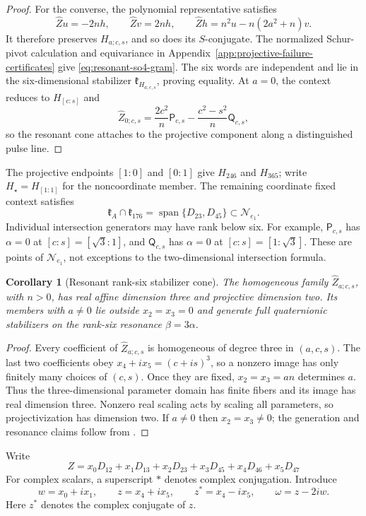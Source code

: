 \documentclass[11pt,a4paper]{article}
\newtheorem{corollary}[corollary]{Corollary}
\newcommand{\Span}{\operatorname{span}}
\begin{document}
\begin{proof}
For the converse, the polynomial representative satisfies
\[
\widehat Z u=-2nh,
\qquad
\widehat Z v=2nh,
\qquad
\widehat Z h=n^2u-n(2a^2+n)v.
\]
It therefore preserves $H_{a;c,s}$, and so does its $S$-conjugate.  The normalized Schur-pivot calculation and equivariance in Appendix~\ref{app:projective-failure-certificates} give \eqref{eq:resonant-so4-gram}.  The six words are independent and lie in the six-dimensional stabilizer $\mathfrak k_{H_{a;c,s}}$, proving equality.  At $a=0$, the context reduces to $H_{[c:s]}$ and
\[
\widehat Z_{0;c,s}
=\frac{2c^2}{n}\mathsf P_{c,s}
 -\frac{c^2-s^2}{n}\mathsf Q_{c,s},
\]
so the resonant cone attaches to the projective component along a distinguished pulse line.
\end{proof}

The projective endpoints $[1:0]$ and $[0:1]$ give $H_{246}$ and $H_{365}$;
write $H_\star=H_{[1:1]}$ for the noncoordinate member.  The remaining coordinate
fixed context satisfies
\[
\mathfrak k_A\cap\mathfrak k_{176}=\Span\{D_{23},D_{45}\}\subset\mathcal N_{e_1}.
\]
Individual intersection generators may have rank below six.  For example,
$\mathsf P_{c,s}$ has $\alpha=0$ at $[c:s]=[\sqrt3:1]$, and
$\mathsf Q_{c,s}$ has $\alpha=0$ at $[c:s]=[1:\sqrt3]$.
These are points of $\mathcal N_{e_1}$, not exceptions to the two-dimensional intersection formula.



\begin{corollary}[Resonant rank-six stabilizer cone]
\label{cor:resonant-cone}
The homogeneous family $\widehat Z_{a;c,s}$, with $n>0$, has real affine dimension
three and projective dimension two.  Its members with $a\ne0$ lie outside
$x_2=x_3=0$ and generate full quaternionic stabilizers on the rank-six resonance
$\beta=3\alpha$.
\end{corollary}
\begin{proof}
Every coefficient of $\widehat Z_{a;c,s}$ is homogeneous of degree three in $(a,c,s)$.
The last two coefficients obey $x_4+ix_5=(c+is)^3$, so a nonzero image has only
finitely many choices of $(c,s)$.  Once they are fixed, $x_2=x_3=an$ determines $a$.
Thus the three-dimensional parameter domain has finite fibers and its image has
real dimension three.  Nonzero real scaling acts by scaling all parameters, so
projectivization has dimension two.  If $a\ne0$ then $x_2=x_3\ne0$; the generation
and resonance claims follow from .
\end{proof}


Write
\[
Z=x_0D_{12}+x_1D_{13}+x_2D_{23}+x_3D_{45}+x_4D_{46}+x_5D_{47}
\]
For complex scalars, a superscript $\ast$ denotes complex conjugation. Introduce
\[
w=x_0+ix_1,
\qquad z=x_4+ix_5,
\qquad z^\ast=x_4-ix_5,
\qquad \omega=z-2iw.
\]
Here $z^\ast$ denotes the complex conjugate of $z$.
\end{document}
